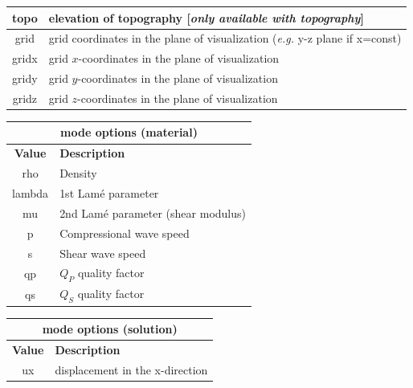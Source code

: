 \documentclass[11pt]{report}
\begin{document}
{\begin{center}
\begin{tabular}{|c|l|}
		topo       & elevation of topography [\emph{only available with topography}]                   \\ \hline
		grid       & grid coordinates in the plane of visualization (\emph{e.g.} y-z plane if x=const) \\ \hline
		gridx      & grid $x$-coordinates in the plane of visualization                                \\ \hline
		gridy      & grid $y$-coordinates in the plane of visualization                                \\ \hline
		gridz      & grid $z$-coordinates in the plane of visualization                                \\ \hline
	\end{tabular}
\end{center}
\begin{center}
	\begin{tabular}{|c|l|} \hline
		\multicolumn{2}{|c|}{\bf mode options (material)} \\ \hline
		\bf{Value} & \bf{Description}                     \\
		\hline  \hline
		rho        & Density                              \\ \hline
		lambda     & 1st Lam\'e parameter                 \\ \hline
		mu         & 2nd Lam\'e parameter (shear modulus) \\ \hline
		p          & Compressional wave speed             \\ \hline
		s          & Shear wave speed                     \\ \hline
		qp         & $Q_P$ quality factor                 \\ \hline
		qs         & $Q_S$ quality factor                 \\ \hline
	\end{tabular}
\end{center}
\begin{center}
	\begin{tabular}{|c|l|} \hline
		\multicolumn{2}{|c|}{\bf mode options (solution)}                              \\ \hline
		\bf{Value}         & \bf{Description}                                          \\
		\hline  \hline
		ux                 & displacement in the x-direction                           \\ \hline

\end{tabular}
\end{center}}
\end{document}

